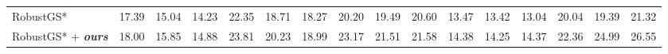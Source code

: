 \begin{table}[!ht]
{\begin{tabular}{@{}l|ccc|ccc|ccc|ccc|ccc}
    RobustGS* & 17.39 & 15.04 & 14.23 & 22.35 & 18.71 & 18.27 & 20.20 & 19.49 & 20.60 & 13.47 & \cellcolor[HTML]{FFE4CF}13.42 & \cellcolor[HTML]{FFFFD4}13.04 & 20.04 & 19.39 & 21.32 \\

    RobustGS* + \textbf{\textit{ours}}  & \cellcolor[HTML]{FFFFD4}18.00 & \cellcolor[HTML]{FFFFD4}15.85 & \cellcolor[HTML]{FFFFD4}14.88 & \cellcolor[HTML]{FFFFD4}23.81 & \cellcolor[HTML]{FFFFD4}20.23 & \cellcolor[HTML]{FFFFD4}18.99 & \cellcolor[HTML]{FFFFD4}23.17 & \cellcolor[HTML]{FFFFD4}21.51 & \cellcolor[HTML]{FFFFD4}21.58 & \cellcolor[HTML]{FFCCC9}14.38 & \cellcolor[HTML]{FFCCC9}14.25 & \cellcolor[HTML]{FFCCC9}14.37 & \cellcolor[HTML]{FFFFD4}22.36 & \cellcolor[HTML]{FFFFD4}24.99 & \cellcolor[HTML]{FFFFD4}26.55 \\ 

  \bottomrule
  \end{tabular}
  }
\end{table}

